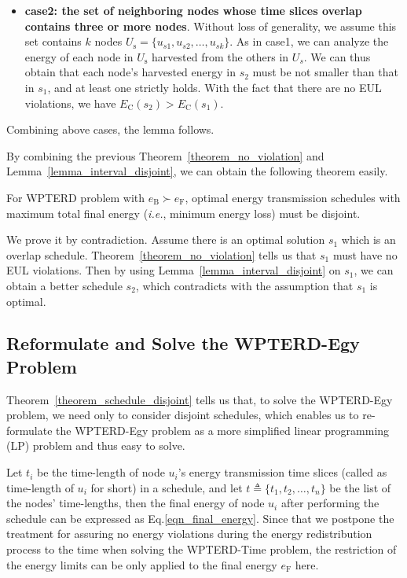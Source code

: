 \documentclass[journal,10pt]{IEEEtran}
\begin{document}
\begin{IEEEproof}
\begin{itemize}
\item{\textbf{case2: the set of neighboring nodes whose time slices overlap contains three or more nodes}}.
Without loss of generality, we assume this set contains $k$ nodes $U_\text{s}{=}\{u_{s1},u_{s2},\ldots,u_{sk}\}$. As in case1, we can analyze the energy of each node in $U_\text{s}$ harvested from the others in $U_s$. We can thus obtain that each node's harvested energy in $s_2$ must be not smaller than that in $s_1$, and at least one strictly holds. With the fact that there are no EUL violations, we have $E_\text{C}(s_2){>}E_\text{C}(s_1)$.

\end{itemize}

Combining above cases, the lemma follows.
\end{IEEEproof}

By combining the previous Theorem~\ref{theorem_no_violation} and Lemma~\ref{lemma_interval_disjoint}, we can obtain the following theorem easily.

\begin{theorem}
\label{theorem_schedule_disjoint}
For WPTERD problem with $e_\text{B}{\succ}e_\text{F}$, optimal energy transmission schedules with maximum total final energy (\textit{i.e.}, minimum energy loss) must be disjoint.
\end{theorem}

\begin{IEEEproof}
We prove it by contradiction. Assume there is an optimal solution $s_1$ which is an overlap schedule. Theorem~\ref{theorem_no_violation} tells us that $s_1$ must have no EUL violations. Then by using Lemma~\ref{lemma_interval_disjoint} on $s_1$, we can obtain a better schedule $s_2$, which contradicts with the assumption that $s_1$ is optimal.
\end{IEEEproof}

\subsection{Reformulate and Solve the WPTERD-Egy Problem}

Theorem~\ref{theorem_schedule_disjoint} tells us that, to solve the WPTERD-Egy problem, we need only to consider disjoint schedules, which enables us to re-formulate the WPTERD-Egy problem as a more simplified linear programming (LP) problem and thus easy to solve.

Let $t_i$ be the time-length of node $u_i$'s energy transmission time slices (called as time-length of $u_i$ for short) in a schedule, and let $t{\triangleq}\{t_1,t_2,\ldots,t_n\}$ be the list of the nodes' time-lengths, then the final energy of node $u_i$ after performing the schedule can be expressed as Eq.\eqref{eqn_final_energy}. Since that we postpone the treatment for assuring no energy violations during the energy redistribution process to the time when solving the WPTERD-Time problem, the restriction of the energy limits can be only applied to the final energy $e_\text{F}$ here.
\end{document}
